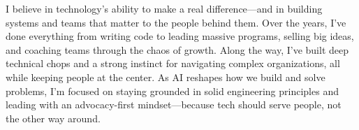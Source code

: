 

\begin{cvparagraph}

I believe in technology’s ability to make a real difference—and in building systems and teams that matter to the people behind them. Over the years, I’ve done everything from writing code to leading massive programs, selling big ideas, and coaching teams through the chaos of growth. Along the way, I’ve built deep technical chops and a strong instinct for navigating complex organizations, all while keeping people at the center. As AI reshapes how we build and solve problems, I’m focused on staying grounded in solid engineering principles and leading with an advocacy-first mindset—because tech should serve people, not the other way around.
\end{cvparagraph}
